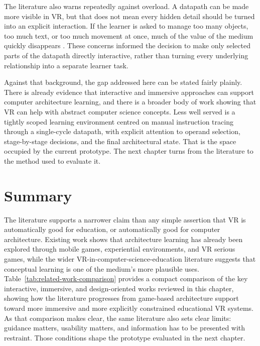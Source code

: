 The literature also warns repeatedly against overload. A datapath can be made more visible in VR, but that does not mean every hidden detail should be turned into an explicit interaction. If the learner is asked to manage too many objects, too much text, or too much movement at once, much of the value of the medium quickly disappears \cite{cook2019challenges,korkut2023visualization,samala2025virtual,lee2020data}. These concerns informed the decision to make only selected parts of the datapath directly interactive, rather than turning every underlying relationship into a separate learner task.

Against that background, the gap addressed here can be stated fairly plainly. There is already evidence that interactive and immersive approaches can support computer architecture learning, and there is a broader body of work showing that VR can help with abstract computer science concepts. Less well served is a tightly scoped learning environment centred on manual instruction tracing through a single-cycle datapath, with explicit attention to operand selection, stage-by-stage decisions, and the final architectural state. That is the space occupied by the current prototype. The next chapter turns from the literature to the method used to evaluate it.

\section{Summary}

The literature supports a narrower claim than any simple assertion that VR is automatically good for education, or automatically good for computer architecture. Existing work shows that architecture learning has already been explored through mobile games, experiential environments, and VR serious games, while the wider VR-in-computer-science-education literature suggests that conceptual learning is one of the medium's more plausible uses. Table~\ref{tab:related-work-comparison} provides a compact comparison of the key interactive, immersive, and design-oriented works reviewed in this chapter, showing how the literature progresses from game-based architecture support toward more immersive and more explicitly constrained educational VR systems. As that comparison makes clear, the same literature also sets clear limits: guidance matters, usability matters, and information has to be presented with restraint. Those conditions shape the prototype evaluated in the next chapter.


